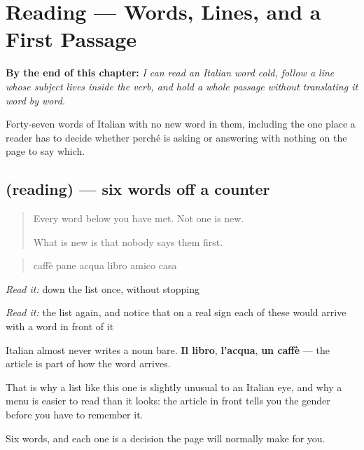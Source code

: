 
\chapter{Reading — Words, Lines, and a First Passage}
\label{ch:it-prima-lettura}

\begin{chapteropening}
\textbf{By the end of this chapter:} \emph{I can read an Italian word cold, follow a line whose subject lives inside the verb, and hold a whole passage without translating it word by word.}

Forty-seven words of Italian with no new word in them, including the one place a reader has to decide whether perché is asking or answering with nothing on the page to say which.
\end{chapteropening}

\section[(reading)]{(reading) — six words off a counter}

\label{lesson:IT-C36-parole}



\begin{quote}
Every word below you have met. Not one is new.

What is new is that nobody says them first.
\end{quote}

\begin{tcolorbox}[breakable,skin=enhanced,colback=orange!6,colframe=orange!45!black,boxrule=0.5pt,arc=1mm,left=6pt,right=6pt,top=4pt,bottom=4pt,fonttitle=\bfseries,title={Read this}]
\begin{quote}
caffè pane acqua libro amico casa
\end{quote}

\emph{Read it:} down the list once, without stopping

\emph{Read it:} the list again, and notice that on a real sign each of these would arrive with a word in front of it
\end{tcolorbox}

\begin{culture}
Italian almost never writes a noun bare. \textbf{Il libro}, \textbf{l'acqua}, \textbf{un caffè} — the article is part of how the word arrives.

That is why a list like this one is slightly unusual to an Italian eye, and why a menu is easier to read than it looks: the article in front tells you the gender before you have to remember it.

Six words, and each one is a decision the page will normally make for you.
\end{culture}

